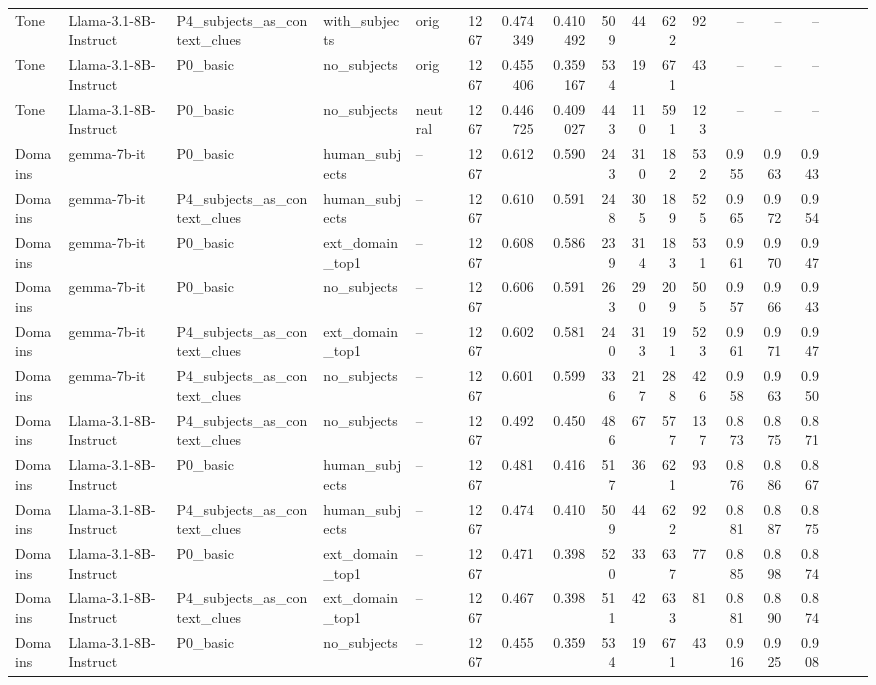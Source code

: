 \begin{landscape}
\begin{longtable}{l P{2.9cm} P{4cm} l P{2.2cm} r r r r r r r r r r r r r}
Tone & Llama-3.1-8B-Instruct & P4\_subjects\_as\_context\_clues & with\_subjects & orig & 1267 & 0.474349 & 0.410492 & 509 & 44 & 622 & 92 & -- & -- & -- \\
Tone & Llama-3.1-8B-Instruct & P0\_basic & no\_subjects & orig & 1267 & 0.455406 & 0.359167 & 534 & 19 & 671 & 43 & -- & -- & -- \\
Tone & Llama-3.1-8B-Instruct & P0\_basic & no\_subjects & neutral & 1267 & 0.446725 & 0.409027 & 443 & 110 & 591 & 123 & -- & -- & -- \\

\midrule
Domains & gemma-7b-it & P0\_basic & human\_subjects & -- & 1267 & 0.612 & 0.590 & 243 & 310 & 182 & 532 & 0.955 & 0.963 & 0.943\\
Domains & gemma-7b-it & P4\_subjects\_as\_context\_clues & human\_subjects & -- & 1267 & 0.610 & 0.591 & 248 & 305 & 189 & 525 & 0.965 & 0.972 & 0.954\\
Domains & gemma-7b-it & P0\_basic & ext\_domain\_top1 & -- & 1267 & 0.608 & 0.586 & 239 & 314 & 183 & 531 & 0.961 & 0.970 & 0.947\\
Domains & gemma-7b-it & P0\_basic & no\_subjects & -- & 1267 & 0.606 & 0.591 & 263 & 290 & 209 & 505 & 0.957 & 0.966 & 0.943\\
Domains & gemma-7b-it & P4\_subjects\_as\_context\_clues & ext\_domain\_top1 & -- & 1267 & 0.602 & 0.581 & 240 & 313 & 191 & 523 & 0.961 & 0.971 & 0.947\\
Domains & gemma-7b-it & P4\_subjects\_as\_context\_clues & no\_subjects & -- & 1267 & 0.601 & 0.599 & 336 & 217 & 288 & 426 & 0.958 & 0.963 & 0.950\\
Domains & Llama-3.1-8B-Instruct & P4\_subjects\_as\_context\_clues & no\_subjects & -- & 1267 & 0.492 & 0.450 & 486 &  67 & 577 & 137 & 0.873 & 0.875 & 0.871\\
Domains & Llama-3.1-8B-Instruct & P0\_basic & human\_subjects & -- & 1267 & 0.481 & 0.416 & 517 &  36 & 621 &  93 & 0.876 & 0.886 & 0.867\\
Domains & Llama-3.1-8B-Instruct & P4\_subjects\_as\_context\_clues & human\_subjects & -- & 1267 & 0.474 & 0.410 & 509 &  44 & 622 &  92 & 0.881 & 0.887 & 0.875\\
Domains & Llama-3.1-8B-Instruct & P0\_basic & ext\_domain\_top1 & -- & 1267 & 0.471 & 0.398 & 520 &  33 & 637 &  77 & 0.885 & 0.898 & 0.874\\
Domains & Llama-3.1-8B-Instruct & P4\_subjects\_as\_context\_clues & ext\_domain\_top1 & -- & 1267 & 0.467 & 0.398 & 511 &  42 & 633 &  81 & 0.881 & 0.890 & 0.874\\
Domains & Llama-3.1-8B-Instruct & P0\_basic & no\_subjects & -- & 1267 & 0.455 & 0.359 & 534 &  19 & 671 &  43 & 0.916 & 0.925 & 0.908\\

\end{longtable}
\end{landscape}

